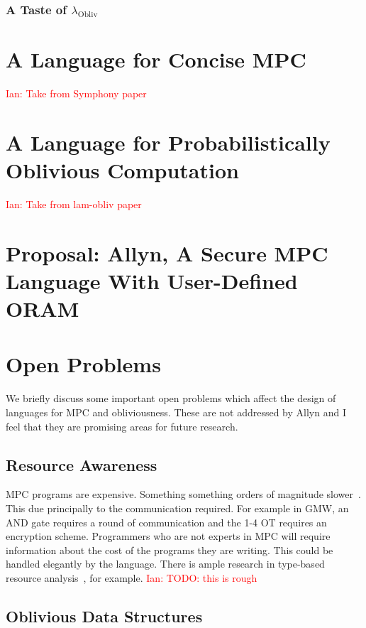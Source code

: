\documentclass{report}
\newcommand{\lang}{Allyn\xspace}
\newcommand{\obliv}{\ensuremath{\lambda_{\mathrm{Obliv}}}\xspace}
\newcommand{\ins}[1]{\textcolor{red}{Ian: #1}}
\begin{document}
\subsection{A Taste of \obliv}

\chapter{A Language for Concise MPC}

\ins{Take from Symphony paper}

\chapter{A Language for Probabilistically Oblivious Computation}

\ins{Take from lam-obliv paper}

\chapter{Proposal: \lang, A Secure MPC Language With User-Defined ORAM}



\chapter{Open Problems}

We briefly discuss some important open problems which affect the design of languages for
MPC and obliviousness. These are not addressed by \lang and I feel that they are promising
areas for future research.

\section{Resource Awareness}

MPC programs are expensive. Something something orders of magnitude slower~\cite{}. This due principally to the communication
required. For example in GMW, an AND gate requires a round of communication and the 1-4 OT requires an encryption scheme.
Programmers who are not experts in MPC will require information about the cost of the programs they are writing. This could be
handled elegantly by the language. There is ample research in type-based resource analysis~\cite{}, for example. \ins{TODO: this is rough}

\section{Oblivious Data Structures}
\end{document}
